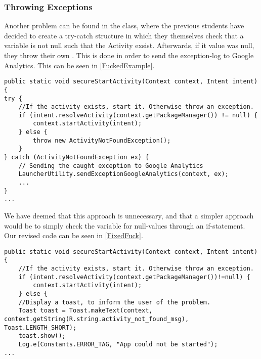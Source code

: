 \subsubsection{Throwing Exceptions}
Another problem can be found in the  class, where the
previous students have decided to create a try-catch structure in which they
themselves check that a variable is not null such that the Activity exsist.
Afterwards, if it value was null, they throw their own . This is done in
order to send the exception-log to Google Analytics. This can be seen in
\autoref{FuckedExample}.\nl

\begin{minipage}[H]{\linewidth}
\begin{lstlisting}[caption = Throwing exceptions in order to send them to Google., label = FuckedExample] 
public static void secureStartActivity(Context context, Intent intent) { 
try {
	//If the activity exists, start it. Otherwise throw an exception.
    if (intent.resolveActivity(context.getPackageManager()) != null) {
    	context.startActivity(intent);
    } else {
    	throw new ActivityNotFoundException();
    }
} catch (ActivityNotFoundException ex) {
	// Sending the caught exception to Google Analytics
    LauncherUtility.sendExceptionGoogleAnalytics(context, ex);
 	...
}
...
\end{lstlisting}
\end{minipage}

We have deemed that this approach is unnecessary, and that a simpler approach
would be to simply check the variable for null-values through an if-statement.
Our revised code can be seen in \autoref{FixedFuck}.\nl

\begin{minipage}[H]{\linewidth}
\begin{lstlisting}[caption = Our approach without throwing exceptions., label = FixedFuck] 
public static void secureStartActivity(Context context, Intent intent) {
	//If the activity exists, start it. Otherwise throw an exception.
	if (intent.resolveActivity(context.getPackageManager())!=null) {
		context.startActivity(intent);
	} else {
	//Display a toast, to inform the user of the problem.
	Toast toast = Toast.makeText(context, context.getString(R.string.activity_not_found_msg), Toast.LENGTH_SHORT);
	toast.show(); 
	Log.e(Constants.ERROR_TAG, "App could not be started");
...
\end{lstlisting}
\end{minipage}

